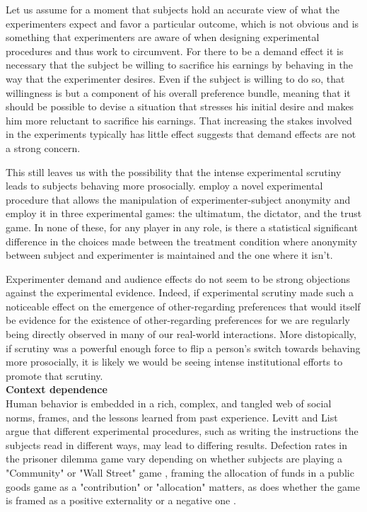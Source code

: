 \documentclass[12pt]{article}
\begin{document}
Let us assume for a moment that subjects hold an accurate view of what the experimenters expect and favor a particular outcome, which is not obvious and is something that experimenters are aware of when designing experimental procedures and thus work to circumvent. For there to be a demand effect it is necessary that the subject be willing to sacrifice his earnings by behaving in the way that the experimenter desires. Even if the subject is willing to do so, that willingness is but a component of his overall preference bundle, meaning that it should be possible to devise a situation that stresses his initial desire and makes him more reluctant to sacrifice his earnings. That increasing the stakes involved in the experiments typically has little effect suggests that demand effects are not a strong concern.

This still leaves us with the possibility that the intense experimental scrutiny leads to subjects behaving more prosocially. \cite{barmettler2012big} employ a novel experimental procedure that allows the manipulation of experimenter-subject anonymity and employ it in three experimental games: the ultimatum, the dictator, and the trust game. In none of these, for any player in any role, is there a statistical significant difference in the choices made between the treatment condition where anonymity between subject and experimenter is maintained and the one where it isn't.

Experimenter demand and audience effects do not seem to be strong objections against the experimental evidence. Indeed, if experimental scrutiny made such a noticeable effect on the emergence of other-regarding preferences that would itself be evidence for the existence of other-regarding preferences for we are regularly being directly observed in many of our real-world interactions. More distopically, if scrutiny was a powerful enough force to flip a person's switch towards behaving more prosocially, it is likely we would be seeing intense institutional efforts to promote that scrutiny.
\\

\textbf{Context dependence}
\\

Human behavior is embedded in a rich, complex, and tangled web of social norms, frames, and the lessons learned from past experience. Levitt and List argue that different experimental procedures, such as writing the instructions the subjects read in different ways, may lead to differing results. Defection rates in the prisoner dilemma game vary depending on whether subjects are playing a "Community" or "Wall Street" game \citep{ward1997naive}, framing the allocation of funds in a public goods game as a "contribution" or "allocation" matters, as does whether the game is framed as a positive externality or a negative one \citep{Andreoni1995}.
\end{document}

